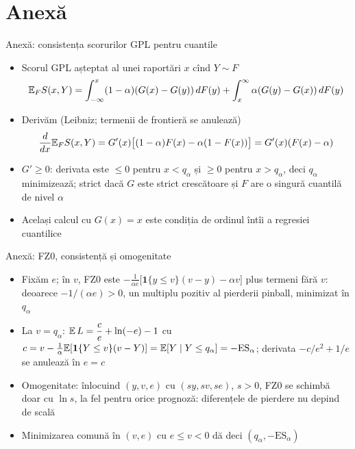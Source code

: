\section{Anexă}

\begin{frame}{Anexă: consistența scorurilor GPL pentru cuantile}
\hypertarget{atsapp1}{}
\itemsize{\small}
\begin{itemize}
    \item Scorul GPL așteptat al unei raportări $x$ cînd $Y \sim F$
    \[ \mathbb{E}_F S(x, Y) = \int_{-\infty}^x(1 - \alpha)(G(x) - G(y))\,dF(y) + \int_x^\infty \alpha(G(y) - G(x))\,dF(y) \]
    \item Derivăm (Leibniz; termenii de frontieră se anulează)
    \[ \frac{d}{dx}\mathbb{E}_F S(x, Y) = G'(x)\big[(1 - \alpha)F(x) - \alpha(1 - F(x))\big] = G'(x)(F(x) - \alpha) \]
    \item $G' \ge 0$: derivata este $\le 0$ pentru $x < q_\alpha$ și $\ge 0$ pentru $x > q_\alpha$, deci $q_\alpha$ minimizează; strict dacă $G$ este strict crescătoare și $F$ are o singură cuantilă de nivel $\alpha$
    \item Același calcul cu $G(x) = x$ este condiția de ordinul întîi a regresiei cuantilice
\end{itemize}
\end{frame}

\begin{frame}{Anexă: FZ0, consistență și omogenitate}
\hypertarget{atsapp2}{}
\itemsize{\small}
\begin{itemize}
    \item Fixăm $e$; în $v$, FZ0 este $-\frac{1}{\alpha e}\big[\mathbf 1\{y \le v\}(v - y) - \alpha v\big]$ plus termeni fără $v$: deoarece $-1/(\alpha e) > 0$, un multiplu pozitiv al pierderii pinball, minimizat în $q_\alpha$
    \item La $v = q_\alpha$: $\mathbb{E}\,L = \dfrac{c}{e} + \ln(-e) - 1$ cu $c = v - \frac1\alpha\mathbb{E}[\mathbf 1\{Y \le v\}(v - Y)] = \mathbb{E}[Y \mid Y \le q_\alpha] = -\mathrm{ES}_\alpha$; derivata $-c/e^2 + 1/e$ se anulează în $e = c$
    \item Omogenitate: înlocuind $(y, v, e)$ cu $(sy, sv, se)$, $s > 0$, FZ0 se schimbă doar cu $\ln s$, la fel pentru orice prognoză: diferențele de pierdere nu depind de scală
    \item Minimizarea comună în $(v, e)$ cu $e \le v < 0$ dă deci $(q_\alpha, -\mathrm{ES}_\alpha)$
\end{itemize}
\end{frame}


